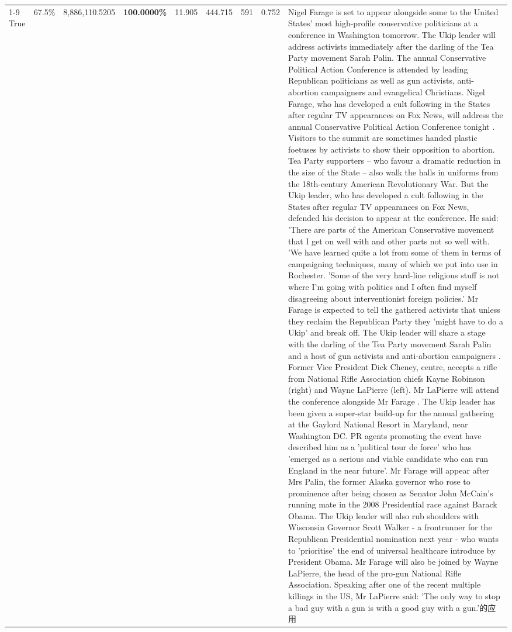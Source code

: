 \begin{table}[H]
\begin{tabular}{lllrlllll}
\cline{1-9}
True & 67.5\% & 8,886,110.5205 & \bfseries \color{red} 100.0000\% & 11.905 & 444.715 & 591 & 0.752 & Nigel Farage is set to appear alongside some to the United States' most high-profile conservative politicians at a conference in Washington tomorrow. The Ukip leader will address activists immediately after the darling of the Tea Party movement Sarah Palin. The annual Conservative Political Action Conference is attended by leading Republican politicians as well as gun activists, anti-abortion campaigners and evangelical Christians. Nigel Farage, who has developed a cult following in the States after regular TV appearances on Fox News, will address the annual Conservative Political Action Conference tonight . Visitors to the summit are sometimes handed plastic foetuses by activists to show their opposition to abortion. Tea Party supporters – who favour a dramatic reduction in the size of the State – also walk the halls in uniforms from the 18th-century American Revolutionary War. But the Ukip leader, who has developed a cult following in the States after regular TV appearances on Fox News, defended his decision to appear at the conference. He said: 'There are parts of the American Conservative movement that I get on well with and other parts not so well with. 'We have learned quite a lot from some of them in terms of campaigning techniques, many of which we put into use in Rochester. 'Some of the very hard-line religious stuff is not where I'm going with politics and I often find myself disagreeing about interventionist foreign policies.' Mr Farage is expected to tell the gathered activists that unless they reclaim the Republican Party they 'might have to do a Ukip' and break off. The Ukip leader will share a stage with the darling of the Tea Party movement Sarah Palin and a host of gun activists and anti-abortion campaigners . Former Vice President Dick Cheney, centre, accepts a rifle from National Rifle Association chiefs Kayne Robinson (right) and Wayne LaPierre (left). Mr LaPierre will attend the conference alongside Mr Farage . The Ukip leader has been given a super-star build-up for the annual gathering at the Gaylord National Resort in Maryland, near Washington DC. PR agents promoting the event have described him as a 'political tour de force' who has 'emerged as a serious and viable candidate who can run England in the near future'. Mr Farage will appear after Mrs Palin, the former Alaska governor who rose to prominence after being chosen as Senator John McCain's running mate in the 2008 Presidential race against Barack Obama. The Ukip leader will also rub shoulders with Wisconsin Governor Scott Walker - a frontrunner for the Republican Presidential nomination next year - who wants to 'prioritise' the end of universal healthcare introduce by President Obama. Mr Farage will also be joined by Wayne LaPierre, the head of the pro-gun National Rifle Association. Speaking after one of the recent multiple killings in the US, Mr LaPierre said: 'The only way to stop a bad guy with a gun is with a good guy with a gun.'的应用 \\

\end{tabular}
\end{table}
